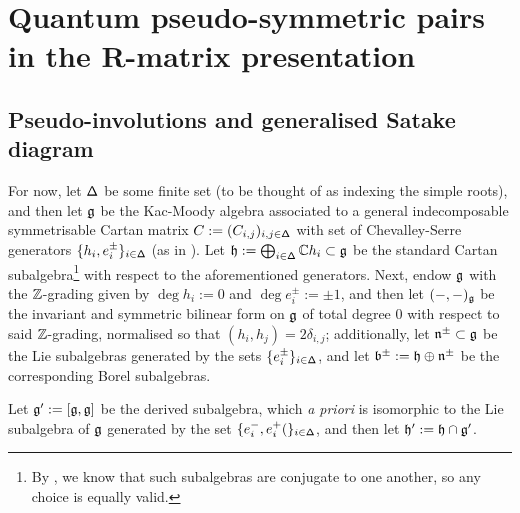 \section{Quantum pseudo-symmetric pairs in the R-matrix presentation}
    \subsection{Pseudo-involutions and generalised Satake diagram}
        For now, let $\mathsf{\Delta}$ be some finite set (to be thought of as indexing the simple roots), and then let $\mathfrak{g}$ be the Kac-Moody algebra associated to a general indecomposable symmetrisable Cartan matrix $C := (C_{i, j})_{i, j \in \mathsf{\Delta}}$ with set of Chevalley-Serre generators $\{h_i, e_i^{\pm}\}_{i \in \mathsf{\Delta}}$ (as in \cite[Chapter 1]{kac_infinite_dimensional_lie_algebras}). Let $\mathfrak{h} := \bigoplus_{i \in \mathsf{\Delta}} \mathbb{C} h_i \subset \mathfrak{g}$ be the standard Cartan subalgebra\footnote{By \cite{kac_peterson_infinite_flag_varieties_and_conjugacy_of_cartan_subalgebras}, we know that such subalgebras are conjugate to one another, so any choice is equally valid.} with respect to the aforementioned generators. Next, endow $\mathfrak{g}$ with the $\mathbb{Z}$-grading given by $\deg h_i := 0$ and $\deg e_i^{\pm} := \pm 1$, and then let $(-, -)_{\mathfrak{g}}$ be the invariant and symmetric bilinear form on $\mathfrak{g}$ of total degree $0$ with respect to said $\mathbb{Z}$-grading, normalised so that $(h_i, h_j) = 2\delta_{i, j}$; additionally, let $\mathfrak{n}^{\pm} \subset \mathfrak{g}$ be the Lie subalgebras generated by the sets $\{e_i^{\pm}\}_{i \in \mathsf{\Delta}}$, and let $\mathfrak{b}^{\pm} := \mathfrak{h} \oplus \mathfrak{n}^{\pm}$ be the corresponding Borel subalgebras.
        
        Let $\mathfrak{g}' := [\mathfrak{g}, \mathfrak{g}]$ be the derived subalgebra, which \textit{a priori} is isomorphic to the Lie subalgebra of $\mathfrak{g}$ generated by the set $\{e_i^-, e_i^+(\}_{i \in \mathsf{\Delta}}$, and then let $\mathfrak{h}' := \mathfrak{h} \cap \mathfrak{g}'$. 

